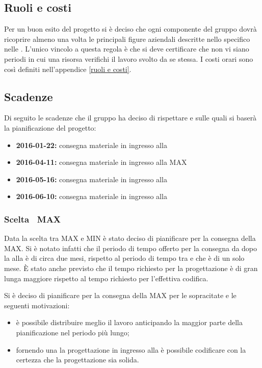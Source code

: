 \documentclass[12pt,a4paper]{article}
\begin{document}
\subsection{Ruoli e costi}
Per un buon esito del progetto si è deciso che ogni componente del gruppo dovrà ricoprire almeno una volta le principali figure aziendali descritte nello specifico nelle \NdP{}. L'unico vincolo a questa regola è che si deve certificare che non vi siano periodi in cui una risorsa verifichi il lavoro svolto da se stessa. I costi orari sono così definiti nell'appendice \ref{ruoli e costi}. 

\subsection{Scadenze}
Di seguito le scadenze che il gruppo \nomeGruppo{} ha deciso di rispettare e sulle quali si baserà la pianificazione del progetto:

\begin{itemize}
	\item \textbf{2016-01-22:} consegna materiale in ingresso alla \RR{}
	\item \textbf{2016-04-11:} consegna materiale in ingresso alla \RP{} MAX
	\item \textbf{2016-05-16:} consegna materiale in ingresso alla \RQ{}
	\item \textbf{2016-06-10:} consegna materiale in ingresso alla \RA{}
\end{itemize}

\subsubsection{Scelta \RP\ MAX}
\label{sec:scelta-rp}
Data la scelta tra \RP{} MAX e \RP{} MIN è stato deciso di pianificare per la consegna della \RP{} MAX.
Si è notato infatti che il periodo di tempo offerto per la consegna da dopo la \RR{} alla \RP{} è di circa due mesi, rispetto al periodo di tempo tra \RP{} e \RQ{} che è di un solo mese. È stato anche previsto che il tempo richiesto per la progettazione è di gran lunga maggiore rispetto al tempo richiesto per l'effettiva codifica.

Si è deciso di pianificare per la consegna della \RP{} MAX per le sopracitate e le seguenti motivazioni:
\begin{itemize}
    \item è possibile distribuire meglio il lavoro anticipando la maggior parte della pianificazione nel periodo più lungo;
    \item fornendo una la progettazione in ingresso alla \RP{} è possibile codificare con la certezza che la progettazione sia solida.
\end{itemize}
\end{document}
